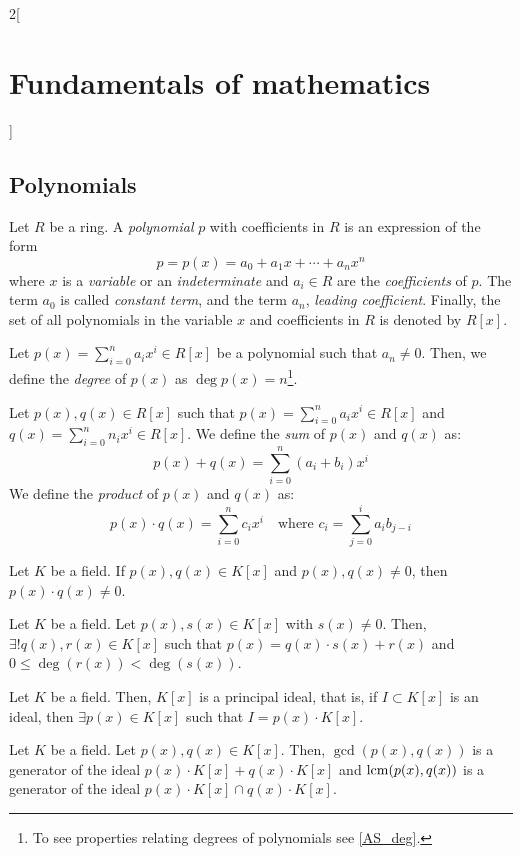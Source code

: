 \documentclass[../../../main_math.tex]{subfiles}
\begin{document}
\begin{multicols}{2}[\section{Fundamentals of mathematics}]
  \subsection{Polynomials}
  \begin{definition}
    Let $R$ be a ring. A \emph{polynomial} $p$ with coefficients in $R$ is an expression of the form $$p=p(x)=a_0+a_1x+\cdots+a_nx^n$$ where $x$ is a \emph{variable} or an \emph{indeterminate} and $a_i\in R$ are the \emph{coefficients} of $p$. The term $a_0$ is called \emph{constant term}, and the term $a_n$, \emph{leading coefficient}. Finally, the set of all polynomials in the variable $x$ and coefficients in $R$ is denoted by $R[x]$.
  \end{definition}
  \begin{definition}
    Let $p(x)=\sum_{i=0}^na_ix^i\in R[x]$ be a polynomial such that $a_n\ne 0$. Then, we define the \emph{degree} of $p(x)$ as $\deg p(x)=n$\footnote{To see properties relating degrees of polynomials see \cref{AS_deg}.}.
  \end{definition}
  \begin{definition}
    Let $p(x),q(x)\in R[x]$ such that $p(x)=\sum_{i=0}^na_ix^i\in R[x]$ and $q(x)=\sum_{i=0}^nn_ix^i\in R[x]$. We define the \emph{sum} of $p(x)$ and $q(x)$ as: $$p(x)+q(x)=\sum_{i=0}^n(a_i+b_i)x^i$$
    We define the \emph{product} of $p(x)$ and $q(x)$ as: $$p(x)\cdot q(x)=\sum_{i=0}^nc_ix^i\quad\text{where } c_i=\sum_{j=0}^ia_ib_{j-i}$$
  \end{definition}
  \begin{proposition}
    Let $K$ be a field. If $p(x),q(x)\in K[x]$ and $p(x),q(x)\ne 0$, then $p(x)\cdot q(x)\ne 0$.
  \end{proposition}
  \begin{theorem}
    Let $K$ be a field. Let $p(x),s(x)\in K[x]$ with $s(x)\ne 0$. Then, $\exists! q(x),r(x)\in K[x]$ such that $p(x)=q(x)\cdot s(x)+r(x)$ and $0\leq\deg(r(x))<\deg(s(x))$.
  \end{theorem}
  \begin{theorem}
    Let $K$ be a field. Then, $K[x]$ is a principal ideal, that is, if $I\subset K[x]$ is an ideal, then $\exists p(x)\in K[x]$ such that $I=p(x)\cdot K[x]$.
  \end{theorem}
  \begin{definition}
    Let $K$ be a field. Let $p(x),q(x)\in K[x]$. Then, $\gcd(p(x),q(x))$ is a generator of the ideal $p(x)\cdot K[x]+q(x)\cdot K[x]$ and $\operatorname{lcm}(p(x),q(x))$ is a generator of the ideal $p(x)\cdot K[x]\cap q(x)\cdot K[x]$.

\end{definition}
\end{multicols}
\end{document}
